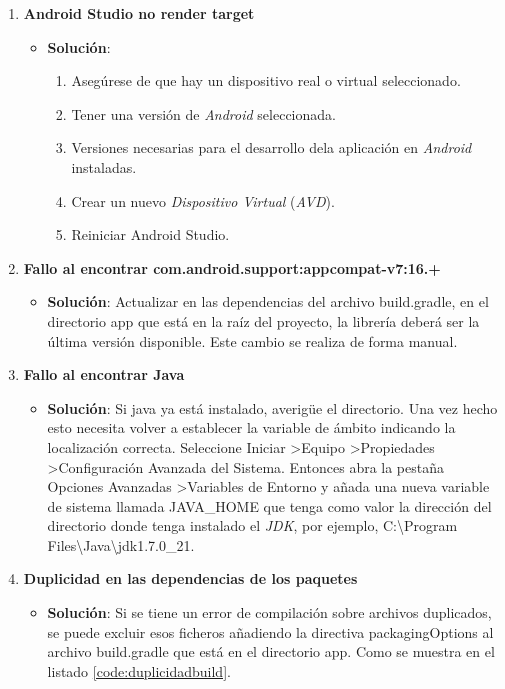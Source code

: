 		\begin{enumerate}
			\item {\bf Android Studio no render target}
			\begin{itemize}
				\item {\bf Solución}:
				\begin{enumerate}
					\item Asegúrese de que hay un dispositivo real o virtual seleccionado.
					\item Tener una versión de {\it Android} seleccionada.
					\item Versiones necesarias para el desarrollo dela aplicación en {\it Android} instaladas.
					\item Crear un nuevo {\it Dispositivo Virtual} ({\it AVD}).
					\item Reiniciar Android Studio.
				\end{enumerate}
			\end{itemize}
			
			\item {\bf Fallo al encontrar com.android.support:appcompat-v7:16.+}
			\begin{itemize}
				\item {\bf Solución}: Actualizar en las dependencias del archivo {\ttfamily build.gradle}, en el directorio {\ttfamily app} que está en la raíz del proyecto, la librería deberá ser la última versión disponible. Este cambio se realiza de forma manual.
			\end{itemize}
			
			\item {\bf Fallo al encontrar Java}
			\begin{itemize}
				\item {\bf Solución}: Si java ya está instalado, averigüe el directorio. Una vez hecho esto necesita volver a establecer la variable de ámbito indicando la localización correcta. Seleccione {\ttfamily Iniciar \textgreater Equipo \textgreater Propiedades \textgreater Configuración Avanzada del Sistema}.
				Entonces abra la pestaña {\ttfamily Opciones Avanzadas \textgreater Variables de Entorno} y añada una nueva variable de sistema llamada {\ttfamily JAVA\_HOME} que  tenga como valor la dirección del directorio donde tenga instalado el {\it JDK}, por ejemplo, {\ttfamily C:{\textbackslash}Program Files{\textbackslash}Java{\textbackslash}jdk1.7.0\_21}. 
			\end{itemize}
			\item {\bf Duplicidad en las dependencias de los paquetes}
			\begin{itemize}
				\item {\bf Solución}: Si se tiene un error de compilación sobre archivos duplicados, se puede excluir esos ficheros añadiendo la directiva {\ttfamily packagingOptions} al archivo {\ttfamily build.gradle} que está en el directorio {\ttfamily app}. Como se muestra en el listado \ref{code:duplicidadbuild}.
				

\end{itemize}
\end{enumerate}
